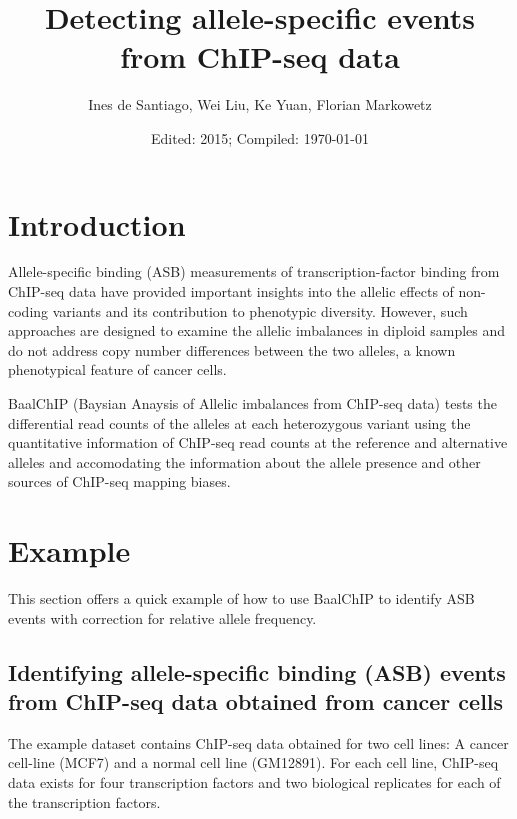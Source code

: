 \documentclass{article}\usepackage[]{graphicx}\usepackage[usenames,dvipsnames]{color}
\begin{document}
\title{Detecting allele-specific events from ChIP-seq data}
\author{Ines de Santiago, Wei Liu, Ke Yuan, Florian Markowetz}

\date{Edited: 2015; Compiled: \today}

\maketitle

\tableofcontents

\section{Introduction}

Allele-specific binding (ASB) measurements of transcription-factor binding from ChIP-seq data have provided important insights into the allelic effects of non-coding variants and its contribution to phenotypic diversity. However, such approaches are designed to examine the allelic imbalances in diploid samples and do not address copy number differences between the two alleles, a known phenotypical feature of cancer cells.

BaalChIP (Baysian Anaysis of Allelic imbalances from ChIP-seq data) tests the differential read counts of the alleles at each heterozygous variant using the quantitative information of ChIP-seq read counts at the reference and alternative alleles and accomodating the information about the allele presence and other sources of ChIP-seq mapping biases.


\section{Example}

This section offers a quick example of how to use BaalChIP to identify ASB events with correction for relative allele frequency.

\subsection{Identifying allele-specific binding (ASB) events from ChIP-seq data obtained from cancer cells}

The example dataset contains ChIP-seq data obtained for two cell lines: A cancer cell-line (MCF7) and a normal cell line (GM12891). For each cell line, ChIP-seq data exists for four transcription factors and two biological replicates for each of the transcription factors.
\end{document}
